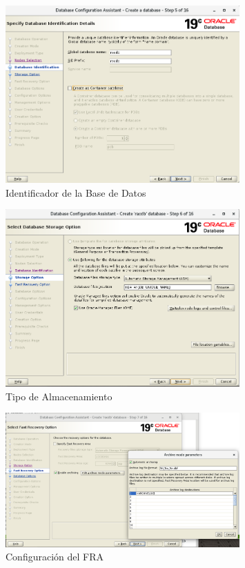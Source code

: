 \documentclass{article}
\begin{document}
\begin{figure}[H]
		\begin{center}
			\includegraphics[width=0.80\textwidth]{db_creation_6_database_identification.png}
		\end{center}
		\caption{Identificador de la Base de Datos}
\end{figure}


\begin{figure}[H]
		\begin{center}
			\includegraphics[width=0.80\textwidth]{db_creation_7_storage_option.png}
		\end{center}
		\caption{Tipo de Almacenamiento}
\end{figure}


\begin{figure}[H]
		\begin{center}
			\includegraphics[width=0.80\textwidth]{db_creation_8_flash_recovery_options.png}
		\end{center}
		\caption{Configuración del FRA}
\end{figure}
\end{document}
